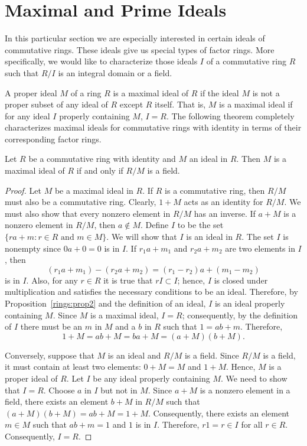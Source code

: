 \section{Maximal and Prime Ideals}
 
 
In this particular section we are especially interested in certain
ideals of commutative rings. These ideals give us special types of factor
rings. More specifically, we would like to characterize those ideals
$I$ of a commutative ring $R$ such that $R/I$ is an integral domain or
a field.  
 
 
A proper ideal $M$ of a ring $R$ is a {\bfi maximal
ideal\/} of $R$ if the ideal
$M$ is not a proper subset of any ideal of $R$ except $R$ itself.
That is, $M$ is a 
maximal ideal if for any ideal $I$ properly containing $M$, $I = R$.
The following theorem completely characterizes maximal ideals for
commutative rings with identity in terms of their corresponding factor
rings.  
 
 
\begin{theorem}\label{theorem:maximalfield}
Let $R$ be a commutative ring with identity and $M$ an ideal in $R$.
Then $M$ is a maximal ideal of $R$ if and only if $R/M$ is a field. 
\end{theorem}
 
 
\begin{proof}
Let $M$ be a maximal ideal in $R$. If $R$ is a commutative ring, then
$R/M$ must also be a commutative ring.  Clearly, $1 + M$ acts as an
identity for $R/M$. We must also show that every nonzero element in
$R/M$ has an inverse.  If $a+M$ is a nonzero element in $R/M$, then $a
\notin M$. Define $I$ to be the set $\{ ra +m : r \in R \mbox{ and } m
\in M \}$. We will show that $I$ is an ideal in $R$. The set $I$ is
nonempty since $0a+0=0$ is in $I$. If $r_1 a +m_1$ and $r_2 a +m_2$
are two elements in $I$, then 
\[
(r_1 a + m_1) - ( r_2 a +m_2) = (r_1 - r_2)a + (m_1 -m_2)
\]
is in $I$. Also, for any $r \in R$ it is true that $rI \subset I$;
hence, $I$ is closed under multiplication and satisfies the
necessary conditions to be an ideal. Therefore, by Proposition~\ref{rings:prop2}
and the definition of an ideal, $I$ is an ideal properly containing
$M$. Since $M$ is a maximal ideal, $I=R$; consequently, by the
definition of $I$ there must be an $m$ in $M$ and a $b$ in $R$ such that
$1=ab+m$. Therefore, 
\[
1 + M = ab + M = ba + M = (a+M)(b+M).
\]
 
 
Conversely, suppose that $M$ is an ideal and $R/M$ is a field. Since
$R/M$ is a field, it must contain at least two elements: $0 + M = M$
and $1 + M$. Hence, $M$ is a proper ideal of $R$.  Let $I$ be any
ideal properly containing $M$. We need to show that $I = R$. Choose
$a$ in $I$ but not in $M$. Since $a+ M$ is a nonzero element in a
field, there exists an element $b +M$ in $R/M$ such that $(a+M)(b+M) =
ab + M = 1+M$.  Consequently, there exists an element $m \in M$ such
that $ab + m = 1$ and $1$ is in $I$. Therefore, $r1 =r \in I$ for all
$r \in R$. Consequently, $I = R$. 
\end{proof}
 
